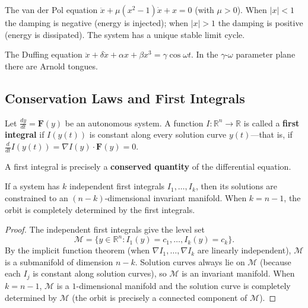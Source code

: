 \begin{example}\label{ex:van_der_pol}
The van der Pol equation $\ddot{x} + \mu(x^2-1)\dot{x} + x = 0$ (with $\mu > 0$). When $|x| < 1$ the damping is negative (energy is injected); when $|x| > 1$ the damping is positive (energy is dissipated). The system has a unique stable limit cycle.
\end{example}

\begin{example}\label{ex:duffing}
The Duffing equation $\ddot{x} + \delta \dot{x} + \alpha x + \beta x^3 = \gamma \cos \omega t$. In the $\gamma$-$\omega$ parameter plane there are Arnold tongues.
\end{example}

\subsection{Conservation Laws and First Integrals}\label{sec:first_integrals}

\begin{definition}\label{def:first_integral}
Let $\frac{dy}{dt} = \mathbf{F}(y)$ be an autonomous system. A function $I: \mathbb{R}^n \to \mathbb{R}$ is called a \textbf{first integral} if $I(y(t))$ is constant along every solution curve $y(t)$---that is, if $\frac{d}{dt} I(y(t)) = \nabla I(y) \cdot \mathbf{F}(y) = 0$.

A first integral is precisely a \textbf{conserved quantity} of the differential equation.
\end{definition}

\begin{proposition}\label{prop:first_integral_orbit}
If a system has $k$ independent first integrals $I_1, \dots, I_k$, then its solutions are constrained to an $(n-k)$-dimensional invariant manifold. When $k = n-1$, the orbit is completely determined by the first integrals.
\end{proposition}

\begin{proof}
The independent first integrals give the level set
\[
\mathcal{M} = \{y \in \mathbb{R}^n : I_1(y) = c_1, \dots, I_k(y) = c_k\}.
\]
By the implicit function theorem (when $\nabla I_1, \dots, \nabla I_k$ are linearly independent), $\mathcal{M}$ is a submanifold of dimension $n-k$. Solution curves always lie on $\mathcal{M}$ (because each $I_j$ is constant along solution curves), so $\mathcal{M}$ is an invariant manifold. When $k = n-1$, $\mathcal{M}$ is a $1$-dimensional manifold and the solution curve is completely determined by $\mathcal{M}$ (the orbit is precisely a connected component of $\mathcal{M}$).
\end{proof}

